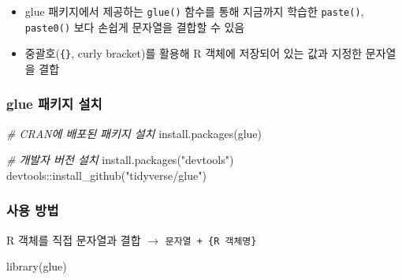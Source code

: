 \documentclass[
  11pt,
]{krantz}
\makeatletter
\newenvironment{Shaded}{\begin{snugshade}}{\end{snugshade}}
\newcommand{\CommentTok}[1]{\textcolor[rgb]{0.37,0.37,0.37}{\textit{#1}}}
\newcommand{\FunctionTok}[1]{\textcolor[rgb]{0,0,0}{#1}}
\newcommand{\NormalTok}[1]{#1}
\newcommand{\SpecialCharTok}[1]{\textcolor[rgb]{0,0,0}{#1}}
\newcommand{\StringTok}[1]{\textcolor[rgb]{0.5,0.5,0.5}{#1}}
\newenvironment{kframe}{%
\medskip{}
\setlength{\fboxsep}{.8em}
 \def\at@end@of@kframe{}%
 \ifinner\ifhmode%
  \def\at@end@of@kframe{\end{minipage}}%
  \begin{minipage}{\columnwidth}%
 \fi\fi%
 \def\FrameCommand##1{\hskip\@totalleftmargin \hskip-\fboxsep
 \colorbox{shadecolor}{##1}\hskip-\fboxsep
     \hskip-\linewidth \hskip-\@totalleftmargin \hskip\columnwidth}%
 \MakeFramed {\advance\hsize-\width
   \@totalleftmargin\z@ \linewidth\hsize
   \@setminipage}}%
 {\par\unskip\endMakeFramed%
 \at@end@of@kframe}
\newenvironment{rmdblock}[1]
  {
  \begin{itemize}
  \renewcommand{\labelitemi}{
    \raisebox{-.7\height}[0pt][0pt]{
      {\setkeys{Gin}{width=3em,keepaspectratio}\texttt{[image: images/\#1]}}
    }
  }
  \setlength{\fboxsep}{1em}
  \begin{kframe}
  \item
  }
  {
  \end{kframe}
  \end{itemize}
  }
\newenvironment{rmdtip}
  {\begin{rmdblock}{tip}}
  {\end{rmdblock}}
\makeatother
\begin{document}
\footnotesize

\begin{rmdtip}
\begin{itemize}
\item
  glue 패키지에서 제공하는 \texttt{glue()} 함수를 통해 지금까지 학습한 \texttt{paste()}, \texttt{paste0()}
  보다 손쉽게 문자열을 결합할 수 있음
\item
  중괄호(\texttt{\{\}}, curly bracket)를 활용해 R 객체에 저장되어 있는 값과 지정한 문자열을 결합
\end{itemize}
\end{rmdtip}

\normalsize

\hypertarget{glue-uxd328uxd0a4uxc9c0-uxc124uxce58}{%
\subsubsection{\texorpdfstring{\textbf{glue} 패키지 설치}{glue 패키지 설치}}\label{glue-uxd328uxd0a4uxc9c0-uxc124uxce58}}

\footnotesize

\begin{Shaded}
\begin{Highlighting}[]
\CommentTok{\# CRAN에 배포된 패키지 설치}
\FunctionTok{install.packages}\NormalTok{(}\StringTok{\textquotesingle{}glue\textquotesingle{}}\NormalTok{)}

\CommentTok{\# 개발자 버전 설치}
\FunctionTok{install.packages}\NormalTok{(}\StringTok{"devtools"}\NormalTok{)}
\NormalTok{devtools}\SpecialCharTok{::}\FunctionTok{install\_github}\NormalTok{(}\StringTok{"tidyverse/glue"}\NormalTok{)}
\end{Highlighting}
\end{Shaded}

\normalsize

\hypertarget{uxc0acuxc6a9-uxbc29uxbc95}{%
\subsubsection{\texorpdfstring{\textbf{사용 방법}}{사용 방법}}\label{uxc0acuxc6a9-uxbc29uxbc95}}

R 객체를 직접 문자열과 결합 \(\rightarrow\) \texttt{문자열\ +\ \{R\ 객체명\}}

\footnotesize

\begin{Shaded}
\begin{Highlighting}[]
\FunctionTok{library}\NormalTok{(glue)}
\end{Highlighting}
\end{Shaded}
\end{document}
